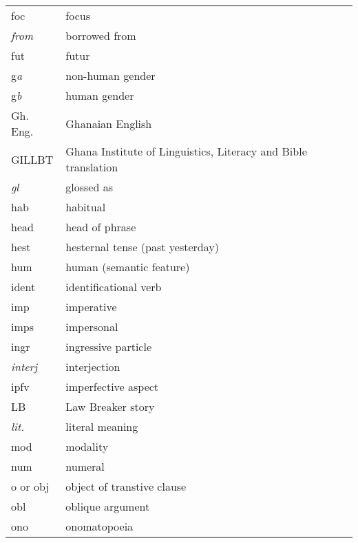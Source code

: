 \begin{xtabular}{ll}
 {\sc foc} & focus \\
  {\it from} & borrowed from \\
{\sc fut} &  futur\\


{\sc g}{\it a} & non-human gender  \\
{\sc g}{\it b} &  human gender\\
Gh. Eng. & Ghanaian English\\
GILLBT & Ghana Institute of Linguistics, Literacy and Bible translation\\
{\it gl} & glossed as\\

{\sc hab} & habitual \\ %
{\sc head} & head of phrase \\ %
 {\sc hest} & hesternal tense (past yesterday) \\
 {\sc hum} & human   (semantic feature)\\

{\sc ident} & identificational verb\\ %
{\sc imp} & imperative\\ %
{\sc imps} & impersonal\\ %
{\sc ingr} & ingressive particle\\
{\it interj} & interjection\\ %
{\sc ipfv} &  imperfective aspect\\%


LB  & Law Breaker story\\
{\it lit.} & literal meaning\\

 {\sc mod} &  modality \\

{\sc num} &  numeral\\ %

{\sc o} or {\sc obj} & object of transtive clause\\
{\sc obl} & oblique argument\\
 {\sc ono} & onomatopoeia \\


\end{xtabular}
